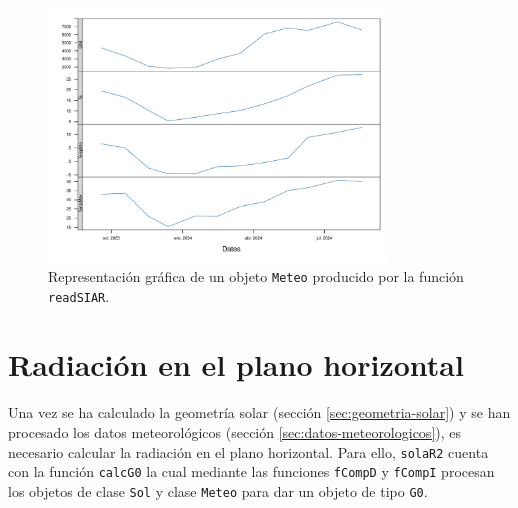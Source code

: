\begin{figure}[!htb]
\centering
\includegraphics[width=0.8\textwidth]{figuras/codigo-readsiar.pdf}
\caption{Representación gráfica de un objeto \texttt{Meteo} producido por la función \texttt{readSIAR}.}
\end{figure}

\FloatBarrier

\section{Radiación en el plano horizontal}
\label{sec:org14c6276}
\label{sec:radiacion-plano-horizontal}
Una vez se ha calculado la geometría solar (sección \ref{sec:geometria-solar}) y se han procesado los datos meteorológicos (sección \ref{sec:datos-meteorologicos}), es necesario calcular la radiación en el plano horizontal. Para ello, \texttt{solaR2} cuenta con la función \texttt{calcG0} la cual mediante las funciones \texttt{fCompD} y \texttt{fCompI} procesan los objetos de clase \texttt{Sol} y clase \texttt{Meteo} para dar un objeto de tipo \texttt{G0}.

